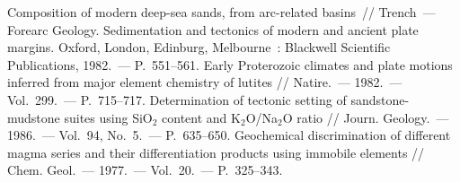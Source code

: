 \begin{thebibliography}{99}
\bibitem{} Composition of modern deep-sea sands, from arc-related basins~// Trench~--- Forearc Geology. Sedimentation and tectonics of modern and ancient plate margins. Oxford, London, Edinburg, Melbourne~: Blackwell Scientific Publications, 1982.~--- P.~551--561.
\bibitem{} Early Proterozoic climates and plate motions inferred from major element chemistry of lutites // Natire.~--- 1982.~--- Vol.~299.~--- P.~715--717.
\bibitem{} Determination of tectonic setting of sandstone-mudstone suites using SiO$_2$ content and K$_2$O/Na$_2$O ratio // Journ. Geology.~--- 1986.~--- Vol.~94, No.~5.~--- P.~635--650.
\bibitem{} Geochemical discrimination of different magma series and their differentiation products using immobile elements // Chem. Geol.~--- 1977.~--- Vol.~20.~--- P.~325--343.

\end{thebibliography}
\thispagestyle{empty}
